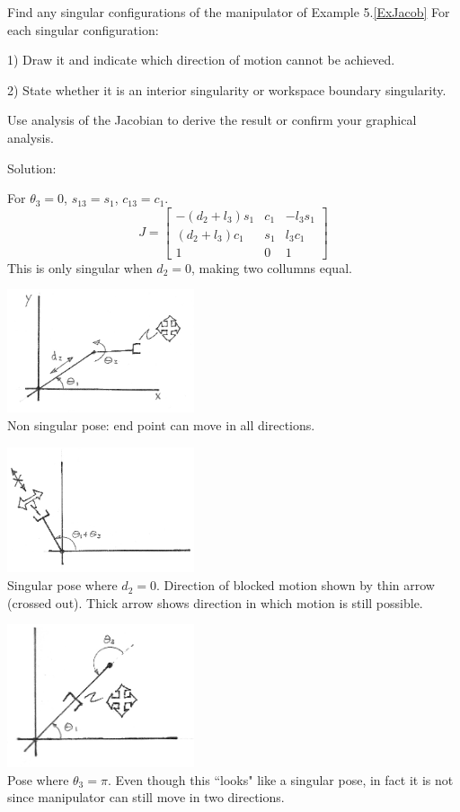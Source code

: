 \begin{ExampleSmall}
Find any singular configurations of the manipulator of Example 5.\ref{ExJacob}
For each singular configuration:

1) Draw it and indicate which direction of motion
cannot be achieved.

2) State whether it is an
interior singularity or workspace boundary singularity.

\noindent
Use analysis of
the Jacobian to derive the result or confirm your graphical analysis.

Solution:

For $\theta_3 = 0$, $s_{13}=s_1$, $c_{13}= c_1$.
\[
J = \left[ \begin{array}{ccc}
-(d_2+l_3)s_{1} & c_1 & -l_3s_{1} \\
(d_2+l_3)c_{1} & s_1 & l_3c_{1} \\
1 & 0 & 1
\end{array}
\right]
\]
This is only singular when $d_2=0$, making two collumns equal.
% 

 
\includegraphics[width=55mm]{figs05/01041a.eps}\\
Non singular pose: end point can move in all directions. 

\includegraphics[width=55mm]{figs05/01041c.eps}\\
Singular pose where $d_2=0$.  Direction of blocked motion shown by thin arrow (crossed out).  Thick arrow shows direction in which motion is still possible. 

\includegraphics[width=55mm]{figs05/01041b.eps}\\
Pose where $\theta_3=\pi$.  Even though this ``looks" like a singular pose, 
in fact it is not since manipulator can still move in two directions.  




\end{ExampleSmall}
